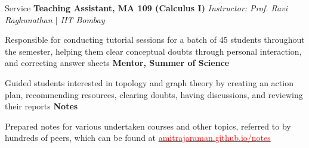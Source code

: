 
\begin{rubric}{Service}
    \entry*[2020] \textbf{Teaching Assistant, MA 109 (Calculus I)} \hfill \emph{Instructor: Prof. Ravi Raghunathan $\mid$ IIT Bombay}
	    
	    Responsible for conducting tutorial sessions for a batch of 45 students throughout the semester, helping them clear conceptual doubts through personal interaction, and correcting answer sheets
	\entry*[2021--2022] \textbf{Mentor, Summer of Science}

		Guided students interested in topology and graph theory by creating an action plan, recommending resources, clearing doubts, having discussions, and reviewing their reports
	\entry*[2020--Present] \textbf{Notes}

		Prepared notes for various undertaken courses and other topics, referred to by hundreds of peers, which can be found at \href{https://amitrajaraman.github.io/notes}{\textcolor{red}{amitrajaraman.github.io/notes}}
\end{rubric}